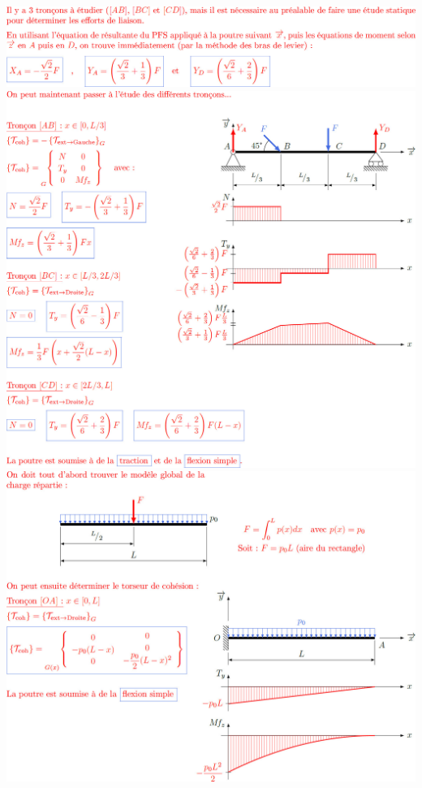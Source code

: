 \documentclass[10pt,fleqn]{article} %
\begin{document}
\begin{center}
\includegraphics[width=\linewidth]{images/cor_01}
\includegraphics[width=\linewidth]{images/cor_02}
\includegraphics[width=\linewidth]{images/cor_03}
\end{center}
\end{document}
